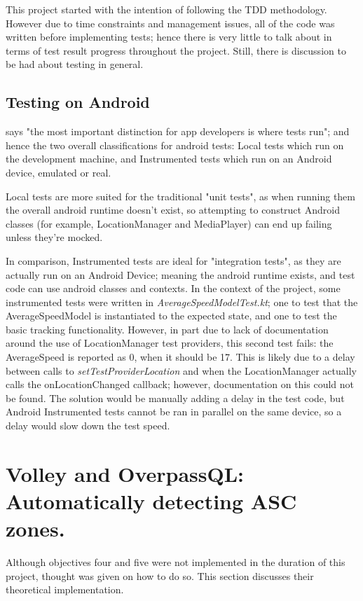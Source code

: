 \documentclass[11pt, a4paper, notitlepage]{report}
\begin{document}
This project started with the intention of following the TDD methodology. However due to time constraints and management issues, all of the code was written before implementing tests; hence there is very little to talk about in terms of test result progress throughout the project. Still, there is discussion to be had about testing in general.

\subsection{Testing on Android}
\citet{testingAndroid} says "the most important distinction for app developers is where tests run"; and hence the two overall classifications for android tests: Local tests which run on the development machine, and Instrumented tests which run on an Android device, emulated or real.

Local tests are more suited for the traditional "unit tests", as when running them the overall android runtime doesn't exist, so attempting to construct Android classes (for example, LocationManager and MediaPlayer) can end up failing unless they're mocked.

In comparison, Instrumented tests are ideal for "integration tests", as they are actually run on an Android Device; meaning the android runtime exists, and test code can use android classes and contexts. In the context of the project, some instrumented tests were written in \textit{AverageSpeedModelTest.kt}; one to test that the AverageSpeedModel is instantiated to the expected state, and one to test the basic tracking functionality. However, in part due to lack of documentation around the use of LocationManager test providers, this second test fails: the AverageSpeed is reported as 0, when it should be 17. This is likely due to a delay between calls to \textit{setTestProviderLocation} and when the LocationManager actually calls the onLocationChanged callback; however, documentation on this could not be found. The solution would be manually adding a delay in the test code, but Android Instrumented tests cannot be ran in parallel on the same device, so a delay would slow down the test speed.

\section{Volley and OverpassQL: Automatically detecting ASC zones.}\label{sec:Vol&OQL}
Although objectives four and five were not implemented in the duration of this project, thought was given on how to do so. This section discusses their theoretical implementation.
\end{document}
